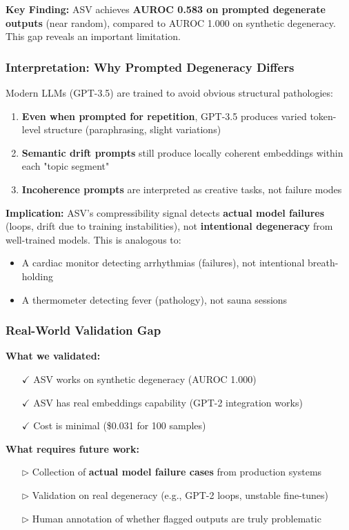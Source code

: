 \documentclass[11pt]{article}
\begin{document}
\textbf{Key Finding:} ASV achieves \textbf{AUROC 0.583 on prompted degenerate outputs} (near random), compared to AUROC 1.000 on synthetic degeneracy. This gap reveals an important limitation.

\subsubsection{Interpretation: Why Prompted Degeneracy Differs}

Modern LLMs (GPT-3.5) are trained to avoid obvious structural pathologies:
\begin{enumerate}
\item \textbf{Even when prompted for repetition}, GPT-3.5 produces varied token-level structure (paraphrasing, slight variations)
\item \textbf{Semantic drift prompts} still produce locally coherent embeddings within each "topic segment"
\item \textbf{Incoherence prompts} are interpreted as creative tasks, not failure modes
\end{enumerate}

\textbf{Implication:} ASV's compressibility signal detects \textbf{actual model failures} (loops, drift due to training instabilities), not \textbf{intentional degeneracy} from well-trained models. This is analogous to:
\begin{itemize}
\item A cardiac monitor detecting arrhythmias (failures), not intentional breath-holding
\item A thermometer detecting fever (pathology), not sauna sessions
\end{itemize}

\subsubsection{Real-World Validation Gap}

\textbf{What we validated:}
\begin{itemize}
\item[$\checkmark$] ASV works on synthetic degeneracy (AUROC 1.000)
\item[$\checkmark$] ASV has real embeddings capability (GPT-2 integration works)
\item[$\checkmark$] Cost is minimal (\$0.031 for 100 samples)
\end{itemize}

\textbf{What requires future work:}
\begin{itemize}
\item[$\triangleright$] Collection of \textbf{actual model failure cases} from production systems
\item[$\triangleright$] Validation on real degeneracy (e.g., GPT-2 loops, unstable fine-tunes)
\item[$\triangleright$] Human annotation of whether flagged outputs are truly problematic
\end{itemize}
\end{document}
